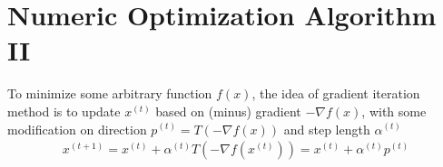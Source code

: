 














\section{Numeric Optimization Algorithm II}
    To minimize some arbitrary function $ f(x) $, the idea of gradient iteration method is to update $ x^{(t)} $ based on (minus) gradient $ -\nabla f(x) $, with some modification on direction $ p^{(t)}=T\left(-\nabla f(x)\right) $ and step length $ \alpha ^{(t)} $
    \begin{align}
        x^{(t+1)}=x^{(t)}+\alpha ^{(t)}T\left(-\nabla f(x^{(t)})\right)=x^{(t)}+\alpha ^{(t)}p^{(t)}
    \end{align}
    
